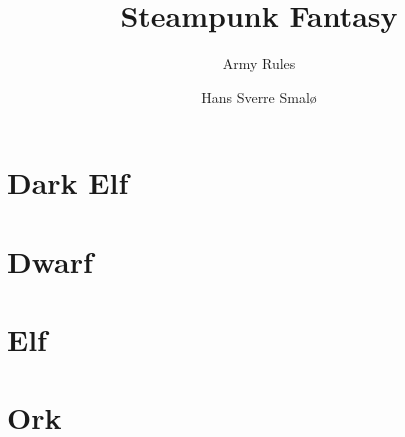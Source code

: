 
\title{Steampunk Fantasy}
\subtitle{Army Rules}
\author{Hans Sverre Smal\o}


\maketitle
\tableofcontents

\chapter{Dark Elf}


\chapter{Dwarf}


\chapter{Elf}


\chapter{Ork}



